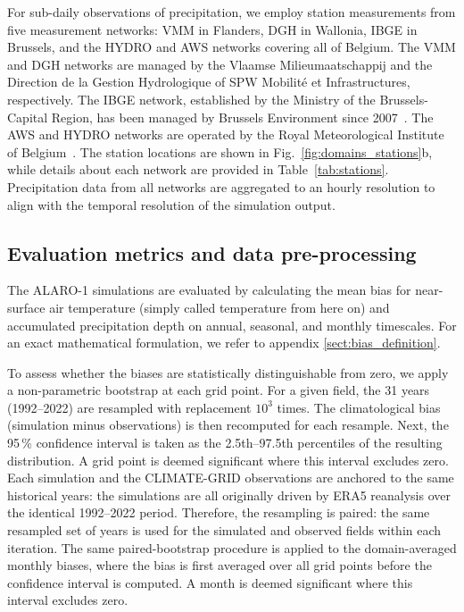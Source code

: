 \documentclass[journal abbreviation, manuscript]{copernicus}
\begin{document}
For sub-daily observations of precipitation, we employ station measurements from five measurement networks: VMM in Flanders, DGH in Wallonia, IBGE in Brussels, and the HYDRO and AWS networks covering all of Belgium. 
The VMM and DGH networks are managed by the Vlaamse Milieumaatschappij and the Direction de la Gestion Hydrologique of SPW Mobilité et Infrastructures, respectively. 
The IBGE network, established by the Ministry of the Brussels-Capital Region, has been managed by Brussels Environment since 2007~\citep{dehem2010validation, journee2014validation}. 
The AWS and HYDRO networks are operated by the Royal Meteorological Institute of Belgium~\citep{van_de_vyver_observed_2021}.
The station locations are shown in Fig.~\ref{fig:domains_stations}b, while details about each network are provided in Table~\ref{tab:stations}.
Precipitation data from all networks are aggregated to an hourly resolution to align with the temporal resolution of the simulation output.

\subsection{Evaluation metrics and data pre-processing}

The ALARO-1 simulations are evaluated by calculating the mean bias for near-surface air temperature (simply called temperature from here on) and accumulated precipitation depth on annual, seasonal, and monthly timescales. 
For an exact mathematical formulation, we refer to appendix \ref{sect:bias_definition}.

To assess whether the biases are statistically distinguishable from zero, we apply a non-parametric bootstrap at each grid point.
For a given field, the 31 years (1992--2022) are resampled with replacement $10^3$ times.
The climatological bias (simulation minus observations) is then recomputed for each resample.
Next, the 95\,\% confidence interval is taken as the 2.5th--97.5th percentiles of the resulting distribution.
A grid point is deemed significant where this interval excludes zero.
Each simulation and the CLIMATE-GRID observations are anchored to the same historical years: the simulations are all originally driven by ERA5 reanalysis over the identical 1992--2022 period.
Therefore, the resampling is paired: the same resampled set of years is used for the simulated and observed fields within each iteration.
The same paired-bootstrap procedure is applied to the domain-averaged monthly biases, where the bias is first averaged over all grid points before the confidence interval is computed.
A month is deemed significant where this interval excludes zero.
\end{document}
